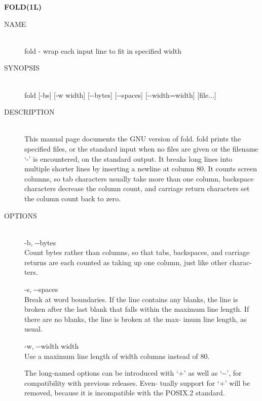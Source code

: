 
\begin{center} {\bf
FOLD(1L)
} \end{center}
\begin{description}


\item[NAME] \hfill \\
       fold - wrap each input line to fit in specified width

\item[SYNOPSIS] \hfill \\
       fold [-bs] [-w width] [-\hspace{.01cm}-bytes] [-\hspace{.01cm}-spaces] [-\hspace{.01cm}-width=width]
       [file...]

\item[DESCRIPTION] \hfill \\
       This manual page documents the GNU version of fold.   fold
       prints  the specified files, or the standard input when no
       files are given or the filename `-' is encountered, on the
       standard  output.   It  breaks  long  lines  into multiple
       shorter lines by inserting a newline  at  column  80.   It
       counts screen columns, so tab characters usually take more
       than one column, backspace characters decrease the  column
       count, and carriage return characters set the column count
       back to zero.

\item[OPTIONS] \hfill \\
       -b, -\hspace{.01cm}-bytes \\
              Count bytes rather  than  columns,  so  that  tabs,
              backspaces,  and  carriage returns are each counted
              as taking up one column, just  like  other  charac-
              ters.

       -s, -\hspace{.01cm}-spaces \\
              Break at word boundaries.  If the line contains any
              blanks, the line is broken  after  the  last  blank
              that  falls  within  the  maximum  line length.  If
              there are no blanks, the line is broken at the max-
              imum line length, as usual.

       -w, -\hspace{.01cm}-width width \\
              Use  a maximum line length of width columns instead
              of 80.

       The long-named options can be introduced with `+' as  well
       as  `-\hspace{.01cm}-', for compatibility with previous releases.  Even-
       tually support for `+' will  be  removed,  because  it  is
       incompatible with the POSIX.2 standard.
\end{description}

